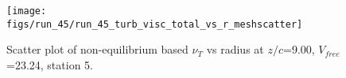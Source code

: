 \begin{figure}[H]
\centering
\texttt{[image: figs/run\_45/run\_45\_turb\_visc\_total\_vs\_r\_meshscatter]}
\caption{Scatter plot of non-equilibrium based $\nu_T$ vs radius at $z/c$=9.00, $V_{free}$=23.24, station 5.}
\label{fig:run_45_turb_visc_total_vs_r_meshscatter}
\end{figure}


